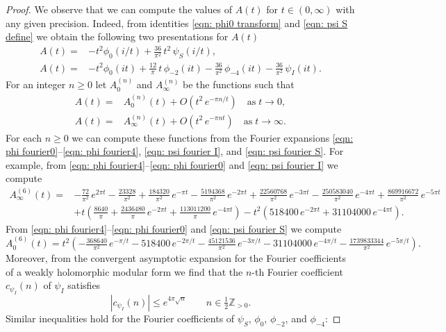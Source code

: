 \documentclass{scrartcl}
\newcommand{\Z}{\mathbb{Z}}
\begin{document}
\begin{proof}
\noindent We observe that we can compute the values of $A(t)$ for $t\in(0,\infty)$ with any given precision. Indeed, from identities \eqref{eqn: phi0 transform} and \eqref{eqn: psi S define} we obtain the following two presentations for $A(t)$
\begin{align*}
 A(t)=&-t^2\phi_0(i/t)+\frac{36}{\pi^2}\,t^2\,\psi_S(i/t),\\
 A(t)=&-t^2\phi_0(it)+\frac{12}{\pi}\,t\,\phi_{-2}(it)-\frac{36}{\pi^2}\,\phi_{-4}(it)-\frac{36}{\pi^2}\,\psi_I(it).
\end{align*}
For an integer $n\geq0$ let $A_0^{(n)}$ and  $A_{\infty}^{(n)}$ be the functions such that
\begin{align}
 A(t)=&A_0^{(n)}(t)+O(t^2\,e^{-\pi n /t})\quad\mbox{as}\;t\to0,\label{eqn: A asymptotic expansion 0}\\
 A(t)=&A_\infty^{(n)}(t)+O(t^2\,e^{-\pi n t})\quad\mbox{as}\;t\to\infty.\label{eqn: A asymptotic expansion infty}
\end{align}
For each $n\geq 0$ we can compute these functions from the Fourier expansions \eqref{eqn: phi fourier0}--\eqref{eqn: phi fourier4}, \eqref{eqn: psi fourier I}, and \eqref{eqn: psi fourier S}.
 For example, from \eqref{eqn: phi fourier4}--\eqref{eqn: phi fourier0} and \eqref{eqn: psi fourier I} we compute
\begin{align*}A_\infty^{(6)}(t)=&\scriptstyle-\tfrac{72}{\pi ^2}\, e^{2 \pi  t}-\tfrac{23328}{\pi ^2}+\tfrac{184320}{\pi ^2}\, e^{-\pi  t}-\tfrac{5194368}{\pi ^2}\, e^{-2 \pi  t}+\tfrac{22560768}{\pi ^2}\, e^{-3 \pi  t}-\tfrac{250583040}{\pi
   ^2}\, e^{-4 \pi  t}+\tfrac{869916672 }{\pi ^2}\,e^{-5 \pi  t}\\&\scriptstyle+t(\tfrac{8640}{\pi }+\tfrac{2436480}{\pi }\, e^{-2 \pi  t}+\tfrac{113011200 }{\pi }\,e^{-4 \pi  t})-t^2(518400\,e^{-2 \pi  t}+31104000\,e^{-4 \pi  t}).
\end{align*}
From \eqref{eqn: phi fourier4}--\eqref{eqn: phi fourier0} and \eqref{eqn: psi fourier S} we compute
$$A_0^{(6)}(t)=t^2(-\tfrac{368640}{\pi ^2}\, e^{-\pi/t}-518400\, e^{-2\pi/t}-\tfrac{45121536}{\pi ^2}\, e^{-3\pi/t}-31104000\,e^{-4\pi/t}-\tfrac{1739833344}{\pi ^2}\, e^{-5\pi/t}).$$
Moreover, from the convergent asymptotic expansion for the Fourier coefficients of a weakly holomorphic modular form \cite[Proposition 1.12]{Bruinier} we find that the $n$-th Fourier coefficient $c_{\psi_I}(n)$ of $\psi_I$ satisfies
\begin{equation}\label{eqn: Fourier estimate 1}|c_{\psi_I}(n)|\leq e^{4\pi\sqrt{n}}\qquad n\in\tfrac 12 \Z_{>0}.\end{equation} Similar inequalities hold for the Fourier coefficients of $\psi_S$, $\phi_0$, $\phi_{-2}$, and $\phi_{-4}$:

\end{proof}
\end{document}
